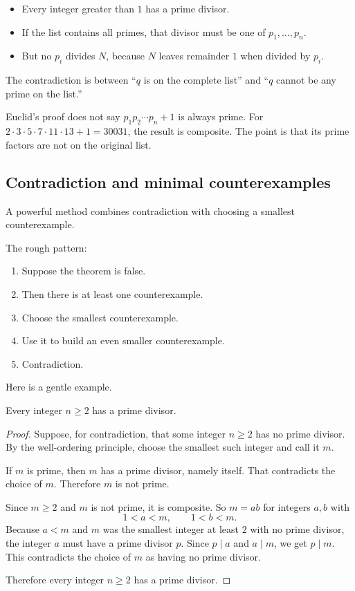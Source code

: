 \begin{itemize}
\item Every integer greater than $1$ has a prime divisor.
\item If the list contains all primes, that divisor must be one of $p_1,\ldots,p_n$.
\item But no $p_i$ divides $N$, because $N$ leaves remainder $1$ when divided by $p_i$.
\end{itemize}

The contradiction is between ``$q$ is on the complete list'' and ``$q$ cannot be any prime on the list.''

\begin{trapbox}
Euclid's proof does not say $p_1p_2\cdots p_n+1$ is always prime. For $2\cdot3\cdot5\cdot7\cdot11\cdot13+1=30031$, the result is composite. The point is that its prime factors are not on the original list.
\end{trapbox}

\subsection{Contradiction and minimal counterexamples}

A powerful method combines contradiction with choosing a smallest counterexample.

The rough pattern:

\begin{enumerate}
\item Suppose the theorem is false.
\item Then there is at least one counterexample.
\item Choose the smallest counterexample.
\item Use it to build an even smaller counterexample.
\item Contradiction.
\end{enumerate}

Here is a gentle example.

\begin{theorem}
Every integer $n\geq2$ has a prime divisor.
\end{theorem}

\begin{proof}
Suppose, for contradiction, that some integer $n\geq2$ has no prime divisor. By the well-ordering principle, choose the smallest such integer and call it $m$.

If $m$ is prime, then $m$ has a prime divisor, namely itself. That contradicts the choice of $m$. Therefore $m$ is not prime.

Since $m\geq2$ and $m$ is not prime, it is composite. So $m=ab$ for integers $a,b$ with
\[
1<a<m,\qquad 1<b<m.
\]
Because $a<m$ and $m$ was the smallest integer at least $2$ with no prime divisor, the integer $a$ must have a prime divisor $p$. Since $p\mid a$ and $a\mid m$, we get $p\mid m$. This contradicts the choice of $m$ as having no prime divisor.

Therefore every integer $n\geq2$ has a prime divisor.
\end{proof}

